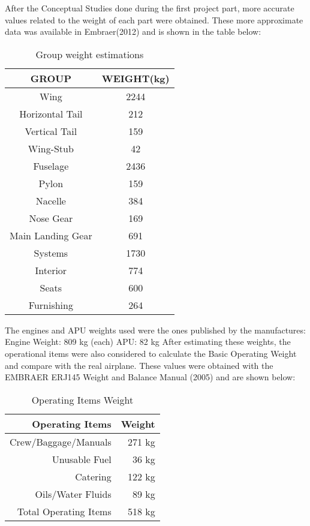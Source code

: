 After the Conceptual Studies done during the first project part, more accurate values related to the weight of each part were obtained. These more approximate data was available in Embraer(2012) and is shown in the table below:

\begin{table}[htbp]
  \centering
  \caption{Group weight estimations}
    \begin{tabular}{cc}
    \toprule
    \textbf{GROUP} & \textbf{WEIGHT(kg)} \\
    \midrule
    Wing  & 2244 \\
    Horizontal Tail & 212 \\
    Vertical Tail & 159 \\
    Wing-Stub & 42 \\
    Fuselage & 2436 \\
    Pylon & 159 \\
    Nacelle & 384 \\
    Nose Gear & 169 \\
    Main Landing Gear & 691 \\
    Systems & 1730 \\
    Interior & 774 \\
    Seats & 600 \\
    Furnishing & 264 \\
    \bottomrule
    \end{tabular}%
  \label{tab:groupweight}%
\end{table}%

 The engines and APU weights used were the ones published by the manufactures:
                Engine Weight: 809 kg (each)
                APU: 82 kg
After estimating these weights, the operational items were also considered to calculate the Basic Operating Weight and compare with the real airplane. These values were obtained with the EMBRAER ERJ145 Weight and Balance Manual (2005) and are shown below:

\begin{table}[htbp]
  \centering
  \caption{Operating Items Weight}
    \begin{tabular}{rr}
    \toprule
    \textbf{Operating Items} & \textbf{Weight} \\
    \midrule
    Crew/Baggage/Manuals & 271 kg \\
    Unusable Fuel & 36 kg \\
    Catering & 122 kg \\
    Oils/Water Fluids & 89 kg \\
    Total Operating Items & 518 kg \\
    \bottomrule
    \end{tabular}%
  \label{tab:operationweight}%
\end{table}%

